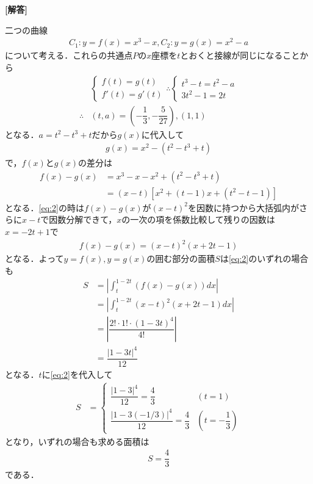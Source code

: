 \documentclass[../../main.tex]{subfiles}
\begin{document}
\begin{oframed}
  
\end{oframed}

{\bf [解答]}

二つの曲線
\begin{align}
  C_1: y = f(x) = x^3-x, C_2: y = g(x) = x^2-a \label{eq:1}
\end{align}
について考える．これらの共通点$P$の$x$座標を$t$とおくと接線が同じになることから
\begin{align}
  &
  \begin{cases}
    f(t) = g(t) \\
    f'(t) = g'(t)
  \end{cases}
  \therefore
  \begin{cases}
    t^3-t=t^2-a \\
    3t^2-1=2t
  \end{cases} \\
  \therefore
  & (t, a) = \left(-\dfrac{1}{3}, -\dfrac{5}{27}\right), (1, 1) \label{eq:2}
\end{align}
となる．$a=t^2 - t^3 + t$だから$g(x)$に代入して
\begin{align}
  g(x) = x^2 - (t^2-t^3+t)
\end{align}
で，$f(x)$と$g(x)$の差分は
\begin{align}
  f(x) - g(x)
  & = x^3-x - x^2 + (t^2-t^3+t) \\
  & = (x-t)\left[x^2 + (t-1)x + (t^2-t-1)\right]
\end{align}
となる．\cref{eq:2}の時は$f(x)-g(x)$が$(x-t)^2$を因数に持つから大括弧内がさらに$x-t$で因数分解できて，$x$の一次の項を係数比較して残りの因数は$x=-2t+1$で
\begin{align}
  f(x) - g(x) = (x-t)^2(x+2t-1)
\end{align}
となる．よって$y=f(x),y=g(x)$の囲む部分の面積$S$は\cref{eq:2}のいずれの場合も
\begin{align}
  S
  & = \left| \int_{t}^{1-2t}(f(x)-g(x))dx\right| \\
  & = \left| \int_{t}^{1-2t}(x-t)^2(x+2t-1)dx\right| \\
  & = \left| \dfrac{2!\cdot 1! \cdot (1-3t)^4}{4!}\right| \\
  & =  \dfrac{|1-3t|^4}{12}
\end{align}
となる．$t$に\cref{eq:2}を代入して
\begin{align}
  S &=
  \begin{cases}
    \dfrac{|1-3|^4}{12} = \dfrac{4}{3} & (t = 1) \\
    \dfrac{|1-3(-1/3)|^4}{12} = \dfrac{4}{3} & \left(t=-\dfrac{1}{3}\right)
  \end{cases}
\end{align}
となり，いずれの場合も求める面積は
\begin{align}
  S = \dfrac{4}{3}
\end{align}
である．
\end{document}
